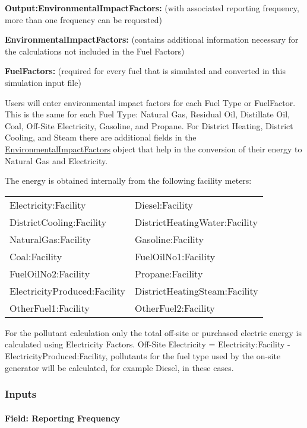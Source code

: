 \textbf{Output:EnvironmentalImpactFactors:} (with associated reporting frequency, more than one frequency can be requested)

\textbf{EnvironmentalImpactFactors:} (contains additional information necessary for the calculations not included in the Fuel Factors)

\textbf{FuelFactors:} (required for every fuel that is simulated and converted in this simulation input file)

Users will enter environmental impact factors for each Fuel Type or FuelFactor. This is the same for each Fuel Type: Natural Gas, Residual Oil, Distillate Oil, Coal, Off-Site Electricity, Gasoline, and Propane. For District Heating, District Cooling, and Steam there are additional fields in the \hyperref[environmentalimpactfactors]{EnvironmentalImpactFactors} object that help in the conversion of their energy to Natural Gas and Electricity.

The energy is obtained internally from the following facility meters:

\begin{longtable}[c]{@{}ll@{}}
\toprule
%
%
Electricity:Facility & Diesel:Facility \tabularnewline
DistrictCooling:Facility & DistrictHeatingWater:Facility \tabularnewline
NaturalGas:Facility & Gasoline:Facility \tabularnewline
Coal:Facility & FuelOilNo1:Facility \tabularnewline
FuelOilNo2:Facility & Propane:Facility \tabularnewline
ElectricityProduced:Facility & DistrictHeatingSteam:Facility \tabularnewline
OtherFuel1:Facility & OtherFuel2:Facility \tabularnewline
\bottomrule
\end{longtable}

For the pollutant calculation only the total off-site or purchased electric energy is calculated using Electricity Factors. Off-Site Electricity = Electricity:Facility - ElectricityProduced:Facility, pollutants for the fuel type used by the on-site generator will be calculated, for example Diesel, in these cases.

\subsubsection{Inputs}\label{inputs-9-017}

\paragraph{Field: Reporting Frequency}\label{field-reporting-frequency-2}

